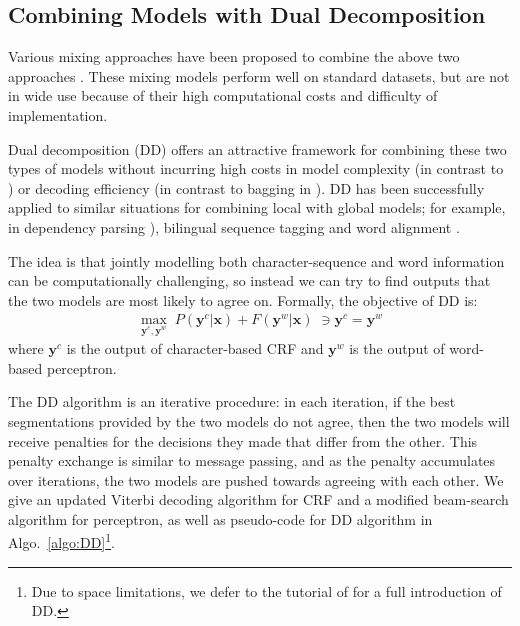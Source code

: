 \subsection{Combining Models with Dual Decomposition} 
Various mixing approaches have been proposed to combine the above two approaches \cite{Wang:2006:SIGHAN,Lin:2009:CICLing,Sun:2009:HLT-NAACL,Sun:2010:COLING,Wang:2010:COLING}. 
These mixing models perform well on standard datasets, but are not in wide use because of their high computational costs and difficulty of implementation.

Dual decomposition (DD) \cite{Rush:2010:EMNLP} offers an attractive framework for combining these two types of models without incurring high costs in model complexity (in contrast to \cite{Sun:2009:HLT-NAACL}) or decoding efficiency (in contrast to bagging in \cite{Wang:2006:SIGHAN,Sun:2010:COLING}). DD has been successfully applied to similar situations for combining local with global models; for example, in dependency parsing \cite{Koo:2010:EMNLP}), bilingual sequence tagging \cite{Wang:2013:ACL} and word alignment \cite{Denero:2011:ACL}.  

The idea is that jointly modelling both character-sequence and word information can be computationally challenging, so instead we can try to find outputs that the two models are most likely to agree on.
Formally, the objective of DD is:
\begin{align*}
   \max_{\mathbf{y^\textit{c}}, \mathbf{y^\textit{w}}}  \; P(\mathbf{y^\textit{c}} | \mathbf{x}) + F(\mathbf{y^\textit{w}} | \mathbf{x}) \;  \ni \mathbf{y^\textit{c}} = \mathbf{y^\textit{w}}
\end{align*}
\noindent where $\mathbf{y^\textit{c}}$ is the output of character-based CRF and $\mathbf{y^\textit{w}}$ is the output of word-based perceptron.

The DD algorithm is an iterative procedure: in each iteration, if the best segmentations provided by the two models do not agree, then the two models will receive penalties for the decisions they made that differ from the other. This penalty exchange is similar to message passing, and as the penalty accumulates over iterations, the two models are pushed towards agreeing with each other. We give an updated Viterbi decoding algorithm for CRF and a modified beam-search algorithm for perceptron, as well as pseudo-code for DD algorithm in Algo.~\ref{algo:DD}\footnote{Due to space limitations, we defer to the tutorial of  for a full introduction of DD.}.


